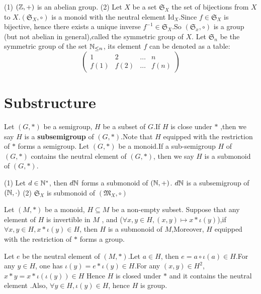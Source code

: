\documentclass{book}
\numberwithin{equation}{section}
\begin{document}
\begin{exampleenv}
    \quad
    \newline
    (1) $(\mathbb{Z},+)$ is an abelian group.
    \newline
    (2) Let $X$ be a set $\mathfrak{S}_X$ the set of bijections from $X$ to $X$.$(\mathfrak{S}_X ,\circ)$ is a monoid with the neutral element $\mathrm{Id}_X$.Since $f\in \mathfrak{S}_X $ is bijective, hence there exists a unique inverse $f^{-1}\in \mathfrak{S} _X$.So $(\mathfrak{S} _x,\circ)$ is a group (but not abelian in general),called the symmetric group of $X$.
    \newline
    Let $\mathfrak{S} _n$ be the symmetric group of the set $\mathbb{N}_{\le n}$, its element $f$ can be denoted as a table:
    $$\begin{pmatrix}
  1&2  &\dots &n \\
  f(1)& f(2) &\dots   &f(n)
\end{pmatrix}$$
\end{exampleenv}
\section{Substructure}
\begin{definitionenv}
    Let $(G,*)$ be a semigroup, $H$ be a subset of $G$.If $H$ is close under $*$ ,then we say $H$ is a \textbf{subsemigroup} of $(G,*)$.Note that $H$ equipped with the restriction of $*$ forms a semigroup.
    Let $(G,*)$ be a monoid.If a sub-semigroup $H$ of $(G,*)$ contains the neutral element of $(G,*)$, then we say $H$ is a submonoid of $(G,*)$.
\end{definitionenv}
\begin{exampleenv}
   \quad
   \newline
   (1) Let $d\in \mathbb{N}^*$, then $d\mathbb{N}$ forms a submonoid of $(\mathbb{N},+)$.
   \newline
   $d\mathbb{N}$ is a subsemigroup of $(\mathbb{N},\cdot)$
    \newline
    (2) $\mathfrak{S} _X$ is submonoid of $(\mathfrak{M} _X,\circ)$
\end{exampleenv}
\begin{propositionenv}
    Let $(M,*)$ be a monoid, $H\subseteq M$ be a non-empty subset. Suppose that any element of $H$ is invertible in $M$ , and ($\forall x,y \in H,(x,y)\mapsto x*\iota(y)$),if $\forall x,y\in H, x*\iota(y)\in H$, then $H$ is a submonoid of $M$,Moreover, $H$ equipped with the restriction of $*$ forms a group. 
\end{propositionenv}
\begin{proofenv}
    Let $e$ be the neutral element of $(M,*)$.Let $a\in H$, then $e=a\circ\iota(a)\in H$.For any $y\in H$, one has $\iota(y)=e*\iota(y)\in H$.For any $(x,y)\in H^2$,$x*y=x*\iota(\iota(y))\in H$ Hence $H$ is closed under $*$ and it contains the neutral element .Also, $\forall y\in H, \iota(y)\in H$, hence $H$ is group. 
\end{proofenv}
\end{document}
